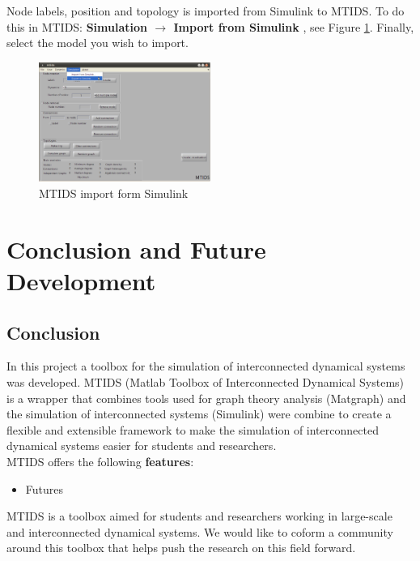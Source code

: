 \documentclass[a4paper,twoside, openright,12pt]{report}
\begin{document}
 Node labels, position and topology is imported from Simulink to MTIDS.
To do this in MTIDS: \textbf{Simulation $\rightarrow$ Import from Simulink }, see Figure \ref{mtidsImportFig}. Finally, select the model you wish to import.

\begin{figure}[htb]
\centering
\includegraphics[width=0.5\textwidth]{pics/mtidsImport.eps}
\caption[MTIDS import form Simulink]{MTIDS import form Simulink}
\label{mtidsImportFig}
\end{figure} 



\chapter{Conclusion and Future Development}

\section{Conclusion}
In this project a toolbox for the simulation of interconnected dynamical systems was developed. MTIDS (Matlab Toolbox of Interconnected Dynamical Systems) is a wrapper that 
combines tools used for graph theory analysis (Matgraph) and the simulation of interconnected systems (Simulink) were combine to create a flexible and extensible 
framework to make the simulation of interconnected dynamical systems easier for students and researchers.\\

MTIDS offers the following \textbf{features}:
\begin{itemize}
 \item Futures
\end{itemize}




MTIDS is a toolbox aimed for students and researchers working in large-scale and interconnected dynamical systems. We would like to coform a community 
around this toolbox that helps push the research on this field forward.
\end{document}
